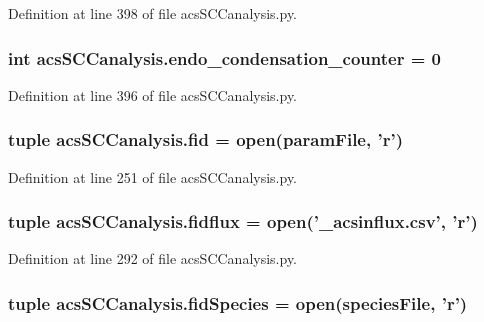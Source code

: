 Definition at line 398 of file acs\+S\+C\+Canalysis.\+py.

\hypertarget{a00130_a20a51ec68106a5a97fb3a72f417ca4e6}{
\subsubsection[{endo\+\_\+condensation\+\_\+counter}]{\setlength{\rightskip}{0pt plus 5cm}int acs\+S\+C\+Canalysis.\+endo\+\_\+condensation\+\_\+counter = 0}}\label{a00130_a20a51ec68106a5a97fb3a72f417ca4e6}


Definition at line 396 of file acs\+S\+C\+Canalysis.\+py.

\hypertarget{a00130_a424e2204e89264a827e6cad861ebcbc1}{
\subsubsection[{fid}]{\setlength{\rightskip}{0pt plus 5cm}tuple acs\+S\+C\+Canalysis.\+fid = open({\bf param\+File}, '{\bf r}')}}\label{a00130_a424e2204e89264a827e6cad861ebcbc1}


Definition at line 251 of file acs\+S\+C\+Canalysis.\+py.

\hypertarget{a00130_a0c40e4d9928e8df792b31c7a431d3fba}{
\subsubsection[{fidflux}]{\setlength{\rightskip}{0pt plus 5cm}tuple acs\+S\+C\+Canalysis.\+fidflux = open('\+\_\+acsinflux.\+csv', '{\bf r}')}}\label{a00130_a0c40e4d9928e8df792b31c7a431d3fba}


Definition at line 292 of file acs\+S\+C\+Canalysis.\+py.

\hypertarget{a00130_aba2f982879776e057b35971b3653549e}{
\subsubsection[{fid\+Species}]{\setlength{\rightskip}{0pt plus 5cm}tuple acs\+S\+C\+Canalysis.\+fid\+Species = open({\bf species\+File}, '{\bf r}')}}\label{a00130_aba2f982879776e057b35971b3653549e}


